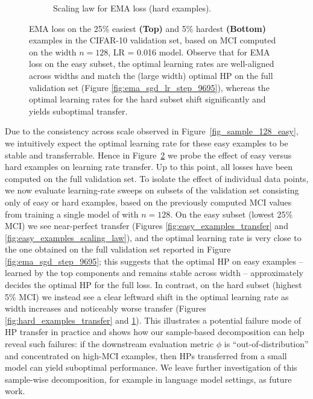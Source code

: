 \begin{figure}[!htb]
\begin{subfigure}[t]{0.4\linewidth}
        \caption{Scaling law for EMA loss (hard examples).}
        \label{fig:hard_examples_scaling_law}
    \end{subfigure}
    \vspace{-1mm}
    \caption{\small EMA loss on the 25\% easiest \textbf{(Top)} and 5\% hardest \textbf{(Bottom)} examples in the CIFAR-10 validation set, based on MCI computed on the width $n = 128$, LR = 0.016 model. Observe that for EMA loss on the easy subset, the optimal learning rates are well-aligned across widths and match the (large width) optimal HP on the full validation set (Figure \ref{fig:ema_sgd_lr_step_9695}), whereas the optimal learning rates for the hard subset shift significantly and yields suboptimal transfer. }
    \label{fig:examples_scaling_law}
    \vspace{-0.9mm} 
\end{figure}

Due to the consistency across scale observed in Figure~\ref{fig_sample_128_easy}, we intuitively expect the optimal learning rate for these easy examples to be stable and transferrable. 
Hence in Figure~\ref{fig:examples_scaling_law} we probe the effect of easy versus hard examples on learning rate transfer. Up to this point, all losses have been computed on the full validation set. To isolate the effect of individual data points, we now evaluate learning-rate sweeps on subsets of the validation set consisting only of easy or hard examples, based on the previously computed MCI values from training a single model of with $n = 128$. 
On the easy subset (lowest 25\% MCI) we see near-perfect transfer (Figures \ref{fig:easy_examples_transfer} and \ref{fig:easy_examples_scaling_law}), and the optimal learning rate is very close to the one obtained on the full validation set reported in Figure \ref{fig:ema_sgd_step_9695}; this suggests that the optimal HP on easy examples -- learned by the top components and remains stable across width -- approximately decides the optimal HP for the full loss. 
In contrast, on the hard subset (highest 5\% MCI) we instead see a clear leftward shift in the optimal learning rate as width increases and noticeably worse transfer (Figures \ref{fig:hard_examples_transfer} and \ref{fig:hard_examples_scaling_law}). 
This illustrates a potential failure mode of HP transfer in practice and shows how our sample-based decomposition can help reveal such failures: if the downstream evaluation metric $\phi$ is ``out-of-distribution'' and concentrated on high-MCI examples, then HPs transferred from a small model can yield suboptimal performance. We leave further investigation of this sample-wise decomposition, for example in language model settings, as future work.  